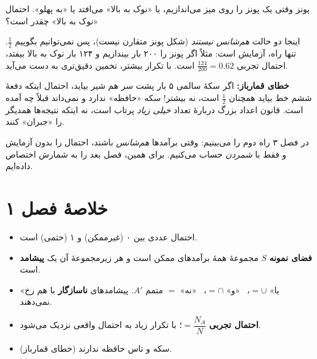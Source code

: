 \begin{example}[label=hs:ex:pin]{پونز}
وقتی یک پونز را روی میز می‌اندازیم، یا «نوک به بالا» می‌افتد یا «به پهلو». احتمال «نوک به بالا» چقدر است؟
\begin{solution}
اینجا دو حالت \emph{هم‌شانس نیستند} (شکل پونز متقارن نیست)، پس نمی‌توانیم بگوییم $\tfrac12$. تنها راه، آزمایش است: مثلاً اگر پونز را ۲۰۰ بار بیندازیم و ۱۲۴ بار نوک به بالا بیفتد، احتمال تجربی $\tfrac{124}{200}=0.62$ است. با تکرار بیشتر، تخمین دقیق‌تری به دست می‌آید.
\end{solution}
\end{example}

\begin{warning}
\textbf{خطای قمارباز:} اگر سکهٔ سالمی ۵ بار پشت سر هم شیر بیاید، احتمال اینکه دفعهٔ ششم خط بیاید همچنان $\tfrac12$ است، نه بیشتر! سکه «حافظه» ندارد و نمی‌داند قبلاً چه آمده است. قانون اعداد بزرگ دربارهٔ تعداد \emph{خیلی زیاد} پرتاب است، نه اینکه نتیجه‌ها همدیگر را «جبران» کنند.
\end{warning}

در فصل ۳ راه دوم را می‌بینیم: وقتی برآمدها \emph{هم‌شانس} باشند، احتمال را بدون آزمایش و فقط با \emph{شمردن} حساب می‌کنیم. برای همین، فصل بعد را به شمارش اختصاص داده‌ایم.

\section*{خلاصهٔ فصل ۱}

\begin{summary}[title={\leavevmode\boxicon{accent}{$\Sigma$}\ \ خلاصهٔ فصل}]
\begin{itemize}
  \item احتمال عددی بین ۰ (غیرممکن) و ۱ (حتمی) است.
  \item \textbf{فضای نمونه} $S$ مجموعهٔ همهٔ برآمدهای ممکن است و هر زیرمجموعهٔ آن یک \textbf{پیشامد} است.
  \item «یا» $=\cup$، \ «و» $=\cap$، \ «نه» $=$ متمم $A'$. پیشامدهای \textbf{ناسازگار} با هم رخ نمی‌دهند.
  \item \textbf{احتمال تجربی} $=\dfrac{N_A}{N}$؛ با تکرار زیاد به احتمال واقعی نزدیک می‌شود.
  \item سکه و تاس حافظه ندارند (خطای قمارباز).
\end{itemize}
\end{summary}

